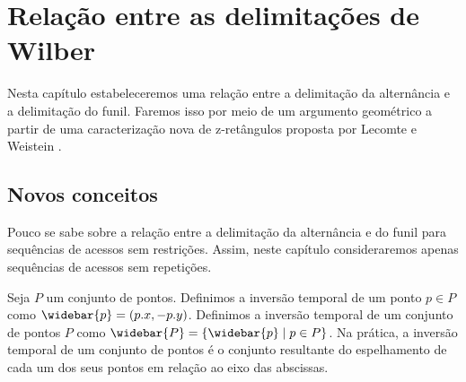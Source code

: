 
\chapter{Relação entre as delimitações de Wilber}
\label{cap:relacao-wilber}

Nesta capítulo estabeleceremos uma relação entre a delimitação da alternância e a delimitação do funil. Faremos isso por meio de um argumento geométrico a partir de uma caracterização nova de z-retângulos proposta por Lecomte e Weistein \cite{new_boundaries}.




\section{Novos conceitos}
Pouco se sabe sobre a relação entre a delimitação da alternância e do funil para sequências de acessos sem restrições. Assim, neste capítulo consideraremos apenas sequências de acessos sem repetições.

Seja $P$ um conjunto de pontos. Definimos a inversão temporal de um ponto $p \in P$ como $\widebar{p} = (p.x,-p.y)$. Definimos a inversão temporal de um conjunto de pontos $P$ como $\widebar{P} = \{\widebar{p} \mid p \in P\}$. Na prática, a inversão temporal de um conjunto de pontos é o conjunto resultante do espelhamento de cada um dos seus pontos em relação ao eixo das abscissas.

